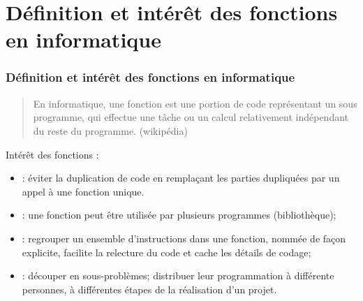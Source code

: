 \documentclass[xcolor=pdftex,svgnames,table]{beamer}
\begin{document}
\section[Introduction]{Définition et intérêt des fonctions en informatique}
\begin{frame}
  \frametitle{Définition et intérêt des fonctions en informatique}
  \begin{quote}
    En informatique, une fonction est une portion de code représentant
    un sous programme, qui effectue une tâche ou un calcul
    relativement indépendant du reste du programme. (wikipédia)
  \end{quote}
\pause
Intérêt des fonctions  :
  \begin{itemize}
  \item {} : éviter la duplication de code en
    remplaçant les parties dupliquées par un appel à une fonction
    unique.\pause
    \item {} : une fonction peut être utilisée
      par plusieurs programmes (bibliothèque);\pause
    \item {} : regrouper un ensemble
      d'instructions dans une fonction, nommée de façon explicite,
      facilite la relecture du code et cache les détails de codage;\pause
    \item {} : découper en sous-problèmes;
      distribuer leur programmation à différente personnes, à
      différentes étapes de la réalisation d'un projet.\pause
  \end{itemize}
\end{frame}
\end{document}
